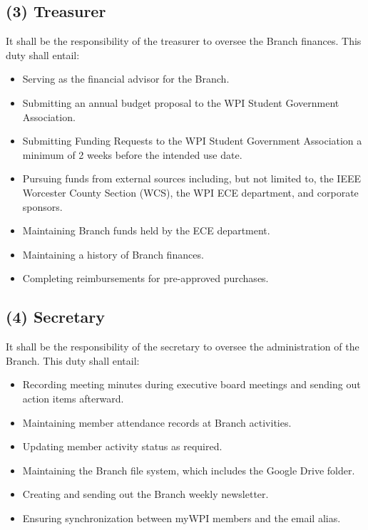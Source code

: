 \documentclass[11pt]{article}
\begin{document}
\subsection*{(3) Treasurer}

It shall be the responsibility of the treasurer to oversee the Branch finances. This duty shall entail:

\begin{itemize}
    \item Serving as the financial advisor for the Branch.
    \item Submitting an annual budget proposal to the WPI Student Government Association.
    \item Submitting Funding Requests to the WPI Student Government Association a minimum of 2 weeks before the intended use date.
    \item Pursuing funds from external sources including, but not limited to, the IEEE Worcester County Section (WCS), the WPI ECE department, and corporate sponsors.
    \item Maintaining Branch funds held by the ECE department.
    \item Maintaining a history of Branch finances.
    \item Completing reimbursements for pre-approved purchases.
\end{itemize}

\subsection*{(4) Secretary}

It shall be the responsibility of the secretary to oversee the administration of the Branch. This duty shall entail:

\begin{itemize}
    \item Recording meeting minutes during executive board meetings and sending out action items afterward.
    \item Maintaining member attendance records at Branch activities.
    \item Updating member activity status as required.
    \item Maintaining the Branch file system, which includes the Google Drive folder.
    \item Creating and sending out the Branch weekly newsletter.
    \item Ensuring synchronization between myWPI members and the email alias.
\end{itemize}
\end{document}
